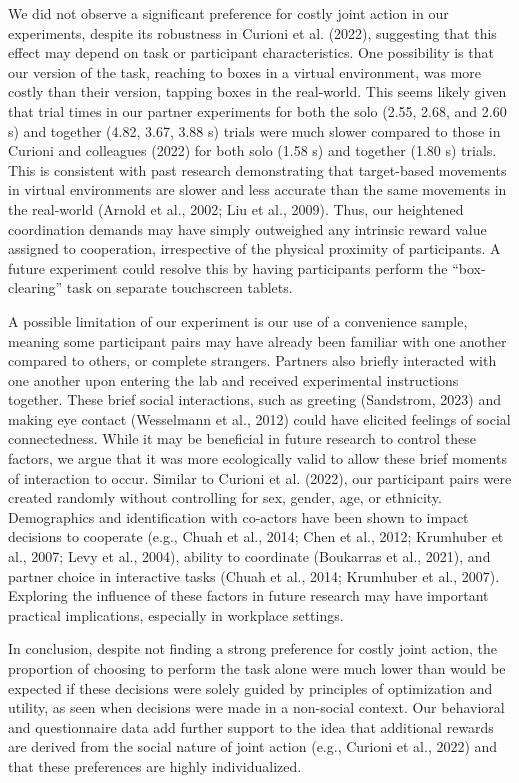 \documentclass[
  11pt,
  letterpaper,
]{article}
\begin{document}
We did not observe a significant preference for costly joint action in
our experiments, despite its robustness in Curioni et al. (2022),
suggesting that this effect may depend on task or participant
characteristics. One possibility is that our version of the task,
reaching to boxes in a virtual environment, was more costly than their
version, tapping boxes in the real-world. This seems likely given that
trial times in our partner experiments for both the solo (2.55, 2.68,
and 2.60 s) and together (4.82, 3.67, 3.88 s) trials were much slower
compared to those in Curioni and colleagues (2022) for both solo (1.58
s) and together (1.80 s) trials. This is consistent with past research
demonstrating that target-based movements in virtual environments are
slower and less accurate than the same movements in the real-world
(Arnold et al., 2002; {Liu et al.}, 2009). Thus, our heightened
coordination demands may have simply outweighed any intrinsic reward
value assigned to cooperation, irrespective of the physical proximity of
participants. A future experiment could resolve this by having
participants perform the ``box-clearing'' task on separate touchscreen
tablets.

A possible limitation of our experiment is our use of a convenience
sample, meaning some participant pairs may have already been familiar
with one another compared to others, or complete strangers. Partners
also briefly interacted with one another upon entering the lab and
received experimental instructions together. These brief social
interactions, such as greeting (Sandstrom, 2023) and making eye contact
(Wesselmann et al., 2012) could have elicited feelings of social
connectedness. While it may be beneficial in future research to control
these factors, we argue that it was more ecologically valid to allow
these brief moments of interaction to occur. Similar to Curioni et al.
(2022), our participant pairs were created randomly without controlling
for sex, gender, age, or ethnicity. Demographics and identification with
co-actors have been shown to impact decisions to cooperate (e.g., Chuah
et al., 2014; Chen et al., 2012; Krumhuber et al., 2007; Levy et al.,
2004), ability to coordinate (Boukarras et al., 2021), and partner
choice in interactive tasks (Chuah et al., 2014; Krumhuber et al.,
2007). Exploring the influence of these factors in future research may
have important practical implications, especially in workplace settings.

In conclusion, despite not finding a strong preference for costly joint
action, the proportion of choosing to perform the task alone were much
lower than would be expected if these decisions were solely guided by
principles of optimization and utility, as seen when decisions were made
in a non-social context. Our behavioral and questionnaire data add
further support to the idea that additional rewards are derived from the
social nature of joint action (e.g., Curioni et al., 2022) and that
these preferences are highly individualized.
\end{document}
